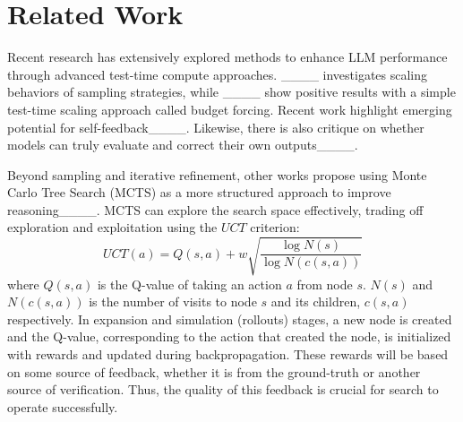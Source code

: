 \section{Related Work}
Recent research has extensively explored methods to enhance LLM performance through advanced test-time compute approaches. ____ investigates scaling behaviors of sampling strategies, while ____ show positive results with a simple test-time scaling approach called budget forcing.
Recent work highlight emerging potential for self-feedback____. Likewise, there is also critique on whether models can truly evaluate and correct their own outputs____. 

Beyond sampling and iterative refinement, other works propose using Monte Carlo Tree Search (MCTS) as a more structured approach to improve reasoning____. MCTS can explore the search space effectively, trading off exploration and exploitation using the $UCT$ criterion: 
\begin{equation}
    UCT(a) = Q(s, a) + w\sqrt{ \frac{\log{N(s)} }{\log N(c(s, a)) } } \label{eq:UCT}
\end{equation}
where $Q(s, a)$ is the Q-value of taking an action $a$ from node $s$. $N(s)$  and $N(c(s, a))$ is the number of visits to node $s$ and its children, $c(s, a)$ respectively.  In  expansion and simulation (rollouts) stages, a new node is created and the Q-value, corresponding to the action that created the node, is initialized with rewards and updated during backpropagation. These rewards will be based on some source of feedback, whether it is from the ground-truth or another source of verification. Thus, the quality of this feedback is crucial for search to operate successfully.

